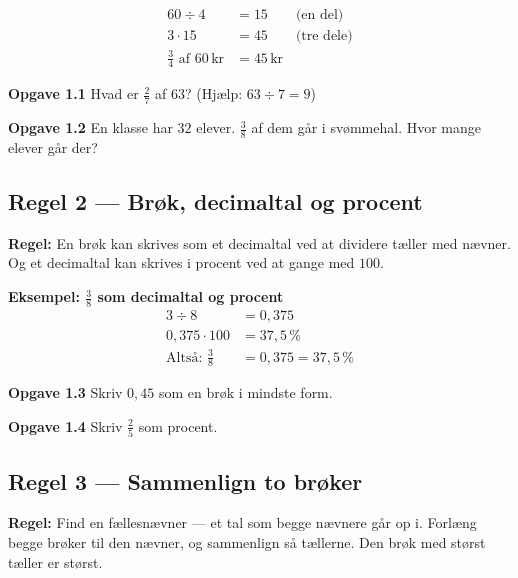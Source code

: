 \documentclass[11pt,a4paper]{article}
\begin{document}
\begin{align*}
  60 \div 4 &= 15 \qquad\text{(en del)}\\
  3 \cdot 15 &= 45 \qquad\text{(tre dele)}\\
  \tfrac{3}{4} \text{ af } 60\,\text{kr} &= 45\,\text{kr}
\end{align*}

\begin{opgavebox}
\textbf{Opgave 1.1} \quad Hvad er $\tfrac{2}{7}$ af $63$? \hfill
{\small\color{inksoft}(Hjælp: $63 \div 7 = 9$)}
\end{opgavebox}

\begin{opgavebox}
\textbf{Opgave 1.2} \quad En klasse har $32$ elever. $\tfrac{3}{8}$ af dem går
i svømmehal. Hvor mange elever går der?
\end{opgavebox}

\subsection*{Regel 2 --- Brøk, decimaltal og procent}

\begin{regelbox}
\textbf{Regel:} En brøk kan skrives som et decimaltal ved at dividere tæller
med nævner. Og et decimaltal kan skrives i procent ved at gange med $100$.
\end{regelbox}

\textbf{Eksempel: $\tfrac{3}{8}$ som decimaltal og procent}
\begin{align*}
  3 \div 8 &= 0{,}375\\
  0{,}375 \cdot 100 &= 37{,}5\,\%\\
  \text{Altså: } \tfrac{3}{8} &= 0{,}375 = 37{,}5\,\%
\end{align*}

\begin{opgavebox}
\textbf{Opgave 1.3} \quad Skriv $0{,}45$ som en brøk i mindste form.
\end{opgavebox}

\begin{opgavebox}
\textbf{Opgave 1.4} \quad Skriv $\tfrac{2}{5}$ som procent.
\end{opgavebox}

\subsection*{Regel 3 --- Sammenlign to brøker}

\begin{regelbox}
\textbf{Regel:} Find en fællesnævner --- et tal som begge nævnere går op i.
Forlæng begge brøker til den nævner, og sammenlign så tællerne. Den brøk
med størst tæller er størst.
\end{regelbox}
\end{document}
